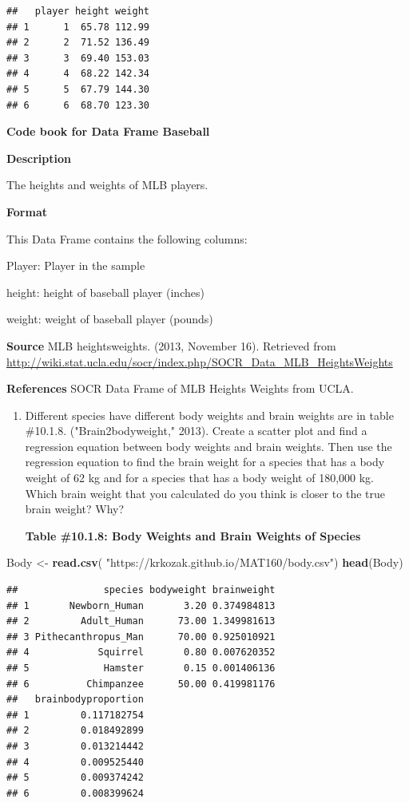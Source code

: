 \documentclass[
]{book}
\newenvironment{Shaded}{\begin{snugshade}}{\end{snugshade}}
\newcommand{\KeywordTok}[1]{\textcolor[rgb]{0.13,0.29,0.53}{\textbf{#1}}}
\newcommand{\NormalTok}[1]{#1}
\newcommand{\StringTok}[1]{\textcolor[rgb]{0.31,0.60,0.02}{#1}}
\begin{document}
\begin{verbatim}
##   player height weight
## 1      1  65.78 112.99
## 2      2  71.52 136.49
## 3      3  69.40 153.03
## 4      4  68.22 142.34
## 5      5  67.79 144.30
## 6      6  68.70 123.30
\end{verbatim}

\textbf{Code book for Data Frame Baseball}

\textbf{Description}

The heights and weights of MLB players.

\textbf{Format}

This Data Frame contains the following columns:

Player: Player in the sample

height: height of baseball player (inches)

weight: weight of baseball player (pounds)

\textbf{Source}
MLB heightsweights. (2013, November 16). Retrieved from
\url{http://wiki.stat.ucla.edu/socr/index.php/SOCR_Data_MLB_HeightsWeights}

\textbf{References}
SOCR Data Frame of MLB Heights Weights from UCLA.

\begin{enumerate}
\def\labelenumi{\arabic{enumi}.}
\setcounter{enumi}{5}
\item
  Different species have different body weights and brain weights are in table \#10.1.8. ("Brain2bodyweight," 2013). Create a scatter plot and find a regression equation between body weights and brain weights. Then use the regression equation to find the brain weight for a species that has a body weight of 62 kg and for a species that has a body weight of 180,000 kg. Which brain weight that you calculated do you think is closer to the true brain weight? Why?

  \textbf{Table \#10.1.8: Body Weights and Brain Weights of Species}
\end{enumerate}

\begin{Shaded}
\begin{Highlighting}[]
\NormalTok{Body <-}\StringTok{ }\KeywordTok{read.csv}\NormalTok{(}
  \StringTok{"https://krkozak.github.io/MAT160/body.csv"}\NormalTok{)}
\KeywordTok{head}\NormalTok{(Body)}
\end{Highlighting}
\end{Shaded}

\begin{verbatim}
##               species bodyweight brainweight
## 1       Newborn_Human       3.20 0.374984813
## 2         Adult_Human      73.00 1.349981613
## 3 Pithecanthropus_Man      70.00 0.925010921
## 4            Squirrel       0.80 0.007620352
## 5             Hamster       0.15 0.001406136
## 6          Chimpanzee      50.00 0.419981176
##   brainbodyproportion
## 1         0.117182754
## 2         0.018492899
## 3         0.013214442
## 4         0.009525440
## 5         0.009374242
## 6         0.008399624
\end{verbatim}
\end{document}

